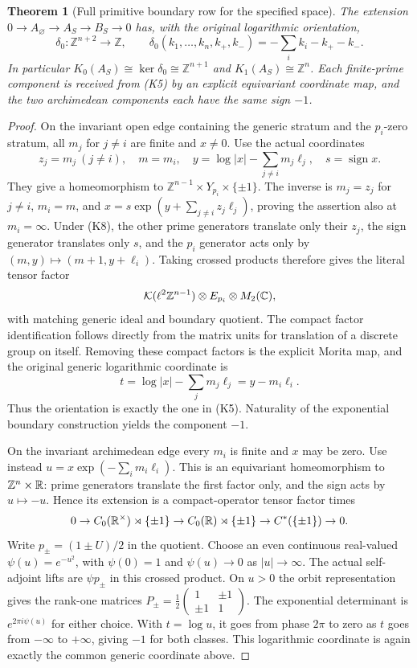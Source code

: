 \documentclass[11pt]{article}
\newtheorem{theorem}{Theorem}[section]
\begin{document}
\begin{theorem}[Full primitive boundary row for the specified space]
The extension $0\to A_\varnothing\to A_S\to B_S\to0$ has, with
the original logarithmic orientation,
\[
 \delta_0:\mathbb Z^{n+2}\longrightarrow\mathbb Z,
 \qquad
 \delta_0(k_1,\ldots,k_n,k_+,k_-)
       =-\sum_i k_i-k_+-k_-.
 \tag{K9}
\]
In particular
$K_0(A_S)\cong\ker\delta_0\cong\mathbb Z^{n+1}$ and
$K_1(A_S)\cong\mathbb Z^n$. Each finite-prime component is received
from (K5) by an explicit equivariant coordinate map, and the two
archimedean components each have the same sign $-1$.
\end{theorem}
\begin{proof}
On the invariant open edge containing the generic stratum and the
$p_i$-zero stratum, all $m_j$ for $j\ne i$ are finite and $x\ne0$.
Use the actual coordinates
\[
 z_j=m_j\ (j\ne i),\quad m=m_i,\quad
 y=\log|x|-\sum_{j\ne i}m_j\ell_j,\quad s=\operatorname{sign}x.
 \tag{K10}
\]
They give a homeomorphism to
$\mathbb Z^{n-1}\times Y_{p_i}\times\{\pm1\}$.
The inverse is
$m_j=z_j$ for $j\ne i$, $m_i=m$, and
$x=s\exp(y+\sum_{j\ne i}z_j\ell_j)$, proving the assertion also
at $m_i=\infty$. Under (K8), the other prime generators translate
only their $z_j$, the sign generator translates only $s$, and the
$p_i$ generator acts only by $(m,y)\mapsto(m+1,y+\ell_i)$.
Taking crossed products therefore gives the literal tensor factor
\[
 \mathcal K(\ell^2\mathbb Z^{n-1})\otimes E_{p_i}\otimes M_2(\mathbb C),
\]
with matching generic ideal and boundary quotient. The compact factor
identification follows directly from the matrix units for translation
of a discrete group on itself. Removing these compact factors is the
explicit Morita map, and the original generic logarithmic coordinate is
\[
 t=\log|x|-\sum_jm_j\ell_j=y-m_i\ell_i.
\]
Thus the orientation is exactly the one in (K5). Naturality of the
exponential boundary construction yields the component $-1$.

On the invariant archimedean edge every $m_i$ is finite and $x$ may
be zero. Use instead
$u=x\exp(-\sum_i m_i\ell_i)$. This is an equivariant homeomorphism
to $\mathbb Z^n\times\mathbb R$: prime generators translate the first
factor only, and the sign acts by $u\mapsto-u$. Hence its extension
is a compact-operator tensor factor times
\[
 0\to C_0(\mathbb R^\times)\rtimes\{\pm1\}
 \to C_0(\mathbb R)\rtimes\{\pm1\}
 \to C^*(\{\pm1\})\to0.
\]
Write $p_\pm=(1\pm U)/2$ in the quotient. Choose an even continuous
real-valued $\psi(u)=e^{-u^2}$, with $\psi(0)=1$ and
$\psi(u)\to0$ as $|u|\to\infty$.
The actual self-adjoint lifts are $\psi p_\pm$ in this crossed
product. On $u>0$ the orbit representation gives the rank-one matrices
$P_\pm=\frac12\left(\begin{smallmatrix}1&\pm1\\\pm1&1\end{smallmatrix}\right)$.
The exponential determinant is $e^{2\pi i\psi(u)}$ for either
choice. With $t=\log u$, it goes from phase $2\pi$ to zero as $t$
goes from $-\infty$ to $+\infty$, giving $-1$ for both classes.
This logarithmic coordinate is again exactly the common generic
coordinate above.


\end{proof}
\end{document}
